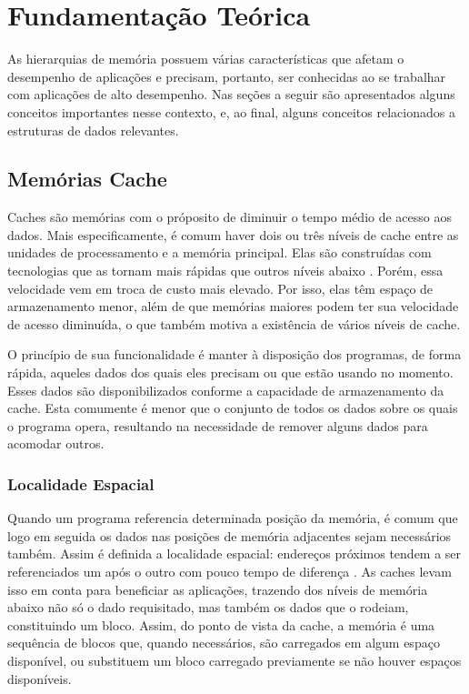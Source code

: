\chapter{Fundamentação Teórica}
\label{cap:fundamentacao_teorica}
\acresetall


As hierarquias de memória possuem várias características que afetam o desempenho de aplicações e precisam, portanto, ser conhecidas ao se trabalhar com aplicações de alto desempenho.
Nas seções a seguir são apresentados alguns conceitos importantes nesse contexto, e, ao final, alguns conceitos relacionados a estruturas de dados relevantes.



\section{Memórias Cache}
\label{sec:memorias_cache}

Caches são memórias com o próposito de diminuir o tempo médio de acesso aos dados. Mais especificamente, é comum haver dois ou três níveis de cache entre as unidades de processamento e a memória principal. Elas são construídas com tecnologias que as tornam mais rápidas que outros níveis abaixo \cite{Patterson}. Porém, essa velocidade vem em troca de custo mais elevado. Por isso, elas têm espaço de armazenamento menor, além de que memórias maiores podem ter sua velocidade de acesso diminuída, o que também motiva a existência de vários níveis de cache.

O princípio de sua funcionalidade é manter à disposição dos programas, de forma rápida, aqueles dados dos quais eles precisam ou que estão usando no momento. Esses dados são disponibilizados conforme a capacidade de armazenamento da cache. Esta comumente é menor que o conjunto de todos os dados sobre os quais o programa opera, resultando na necessidade de remover alguns dados para acomodar outros.

\subsection{Localidade Espacial}
\label{subsec:localidade_espacial}

Quando um programa referencia determinada posição da memória, é comum que logo em seguida os dados nas posições de memória adjacentes sejam necessários também. Assim é definida a localidade espacial: endereços próximos tendem a ser referenciados um após o outro com pouco tempo de diferença \cite{Patterson}. As caches levam isso em conta para beneficiar as aplicações, trazendo dos níveis de memória abaixo não só o dado requisitado, mas também os dados que o rodeiam, constituindo um bloco. Assim, do ponto de vista da cache, a memória é uma sequência de blocos que, quando necessários, são carregados em algum espaço disponível, ou substituem um bloco carregado previamente se não houver espaços disponíveis.

